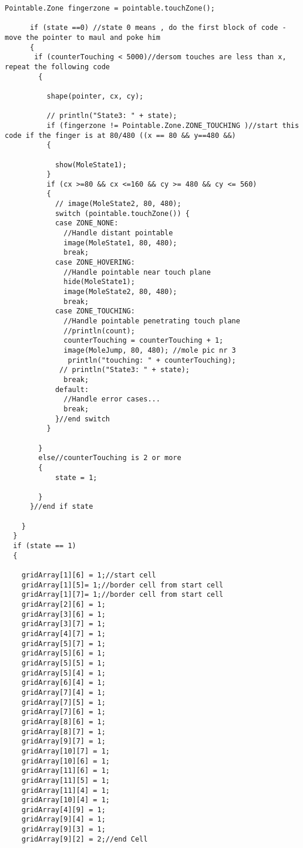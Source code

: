 \begin{lstlisting}[caption = {}, label={lst:Java}]
      Pointable.Zone fingerzone = pointable.touchZone();

      if (state ==0) //state 0 means , do the first block of code - move the pointer to maul and poke him
      {
       if (counterTouching < 5000)//dersom touches are less than x, repeat the following code
        {
         
          shape(pointer, cx, cy);
          
          // println("State3: " + state);   
          if (fingerzone != Pointable.Zone.ZONE_TOUCHING )//start this code if the finger is at 80/480 ((x == 80 && y==480 &&)
          {
            
            show(MoleState1);
          }
          if (cx >=80 && cx <=160 && cy >= 480 && cy <= 560)
          {
            // image(MoleState2, 80, 480);
            switch (pointable.touchZone()) {
            case ZONE_NONE:
              //Handle distant pointable
              image(MoleState1, 80, 480);
              break;
            case ZONE_HOVERING:
              //Handle pointable near touch plane
              hide(MoleState1);
              image(MoleState2, 80, 480);
              break;
            case ZONE_TOUCHING:
              //Handle pointable penetrating touch plane
              //println(count);
              counterTouching = counterTouching + 1;
              image(MoleJump, 80, 480); //mole pic nr 3
               println("touching: " + counterTouching);
             // println("State3: " + state);
              break;
            default:
              //Handle error cases...
              break;
            }//end switch
          }
        
        }
        else//counterTouching is 2 or more
        {
            state = 1;

        }
      }//end if state

    }
  }
  if (state == 1)
  {

    gridArray[1][6] = 1;//start cell
    gridArray[1][5]= 1;//border cell from start cell
    gridArray[1][7]= 1;//border cell from start cell
    gridArray[2][6] = 1;
    gridArray[3][6] = 1;
    gridArray[3][7] = 1;
    gridArray[4][7] = 1;
    gridArray[5][7] = 1;
    gridArray[5][6] = 1;
    gridArray[5][5] = 1;
    gridArray[5][4] = 1;
    gridArray[6][4] = 1;
    gridArray[7][4] = 1;
    gridArray[7][5] = 1;
    gridArray[7][6] = 1;
    gridArray[8][6] = 1;
    gridArray[8][7] = 1;
    gridArray[9][7] = 1;
    gridArray[10][7] = 1;
    gridArray[10][6] = 1;
    gridArray[11][6] = 1;
    gridArray[11][5] = 1;
    gridArray[11][4] = 1;
    gridArray[10][4] = 1;
    gridArray[4][9] = 1;
    gridArray[9][4] = 1;
    gridArray[9][3] = 1;
    gridArray[9][2] = 2;//end Cell


\end{lstlisting}
